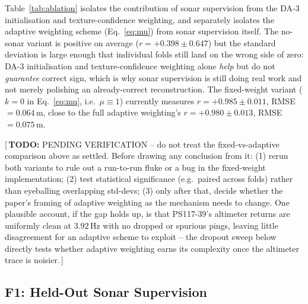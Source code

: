 \documentclass[conference]{IEEEtran}
\newif\ifdraftnotes\draftnotestrue
\newcommand{\needswork}[1]{%
  \ifdraftnotes\textcolor{red!75!black}{\small[\,\textbf{TODO:} #1\,]}\fi}
\begin{document}
Table~\ref{tab:ablation} isolates the contribution of sonar supervision
from the DA-3 initialisation and texture-confidence weighting, and
separately isolates the adaptive weighting scheme (Eq.~\eqref{eq:mu}) from
sonar supervision itself. The no-sonar variant is positive on average
($r = +0.398 \pm 0.647$) but the standard deviation is large enough that
individual folds still land on the wrong side of zero: DA-3 initialisation
and texture-confidence weighting alone \emph{help} but do not
\emph{guarantee} correct sign, which is why sonar supervision is still
doing real work and not merely polishing an already-correct
reconstruction. The fixed-weight variant ($k{=}0$ in Eq.~\eqref{eq:mu},
i.e.\ $\mu \equiv 1$) currently measures $r = +0.985 \pm 0.011$, RMSE
$= 0.064$\,m, close to the full adaptive weighting's
$r = +0.980 \pm 0.013$, RMSE $= 0.075$\,m.

\begin{table}[t]
\centering
\caption{Ablations on PS117-39, 5-fold contiguous CV.}
\label{tab:ablation}
\end{table}

\needswork{PENDING VERIFICATION -- do not treat the fixed-vs-adaptive comparison
above as settled. Before drawing any conclusion from it: (1) rerun both
variants to rule out a run-to-run fluke or a bug in the fixed-weight
implementation; (2) test statistical significance (e.g.\ paired across
folds) rather than eyeballing overlapping std-devs; (3) only after that,
decide whether the paper's framing of adaptive weighting as the mechanism
needs to change. One plausible account, if the gap holds up, is that
PS117-39's altimeter returns are uniformly clean at $3.92$\,Hz with no
dropped or spurious pings, leaving little disagreement for an adaptive
scheme to exploit -- the dropout sweep below directly tests whether
adaptive weighting earns its complexity once the altimeter trace is
noisier.}

\subsection{F1: Held-Out Sonar Supervision}
\end{document}
